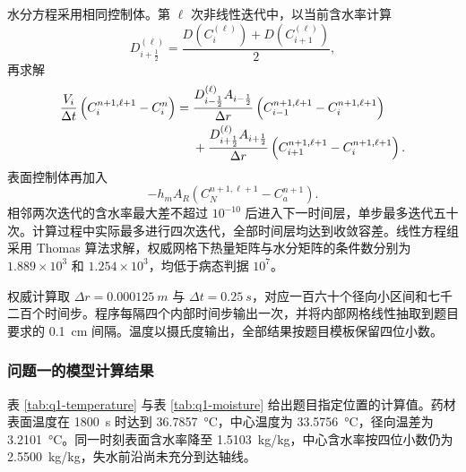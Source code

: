 \documentclass[withoutpreface,bwprint]{cumcmthesis}
\begin{document}
水分方程采用相同控制体。第 \(\ell\) 次非线性迭代中，以当前含水率计算
\begin{equation}
D_{i+\frac12}^{(\ell)}
=
\frac{
D\left(C_i^{(\ell)}\right)
+D\left(C_{i+1}^{(\ell)}\right)
}{2},
\label{eq:interface-diffusivity}
\end{equation}
再求解
\begin{align}
\frac{V_i}{\Delta t}
\left(C_i^{n+1,\ell+1}-C_i^n\right)
={}&
\frac{D_{i-\frac12}^{(\ell)}A_{i-\frac12}}{\Delta r}
\left(C_{i-1}^{n+1,\ell+1}-C_i^{n+1,\ell+1}\right)\notag\\
&+
\frac{D_{i+\frac12}^{(\ell)}A_{i+\frac12}}{\Delta r}
\left(C_{i+1}^{n+1,\ell+1}-C_i^{n+1,\ell+1}\right).
\label{eq:moisture-fvm}
\end{align}
表面控制体再加入
\begin{equation}
-h_mA_R\left(C_N^{n+1,\ell+1}-C_a^{n+1}\right).
\label{eq:surface-moisture-flux}
\end{equation}
相邻两次迭代的含水率最大差不超过 \(10^{-10}\) 后进入下一时间层，单步最多迭代五十次。计算过程中实际最多进行四次迭代，全部时间层均达到收敛容差。线性方程组采用 Thomas 算法求解，权威网格下热量矩阵与水分矩阵的条件数分别为 \(1.889\times10^3\) 和 \(1.254\times10^3\)，均低于病态判据 \(10^7\)。

权威计算取 \(\Delta r=\SI{0.000125}{m}\) 与 \(\Delta t=\SI{0.25}{s}\)，对应一百六十个径向小区间和七千二百个时间步。程序每隔四个内部时间步输出一次，并将内部网格线性抽取到题目要求的 \SI{0.1}{cm} 间隔。温度以摄氏度输出，全部结果按题目模板保留四位小数。


\subsubsection{问题一的模型计算结果}

表 \ref{tab:q1-temperature} 与表 \ref{tab:q1-moisture} 给出题目指定位置的计算值。药材表面温度在 \SI{1800}{s} 时达到 \SI{36.7857}{\degreeCelsius}，中心温度为 \SI{33.5756}{\degreeCelsius}，径向温差为 \SI{3.2101}{\degreeCelsius}。同一时刻表面含水率降至 \SI{1.5103}{kg/kg}，中心含水率按四位小数仍为 \SI{2.5500}{kg/kg}，失水前沿尚未充分到达轴线。
\end{document}
